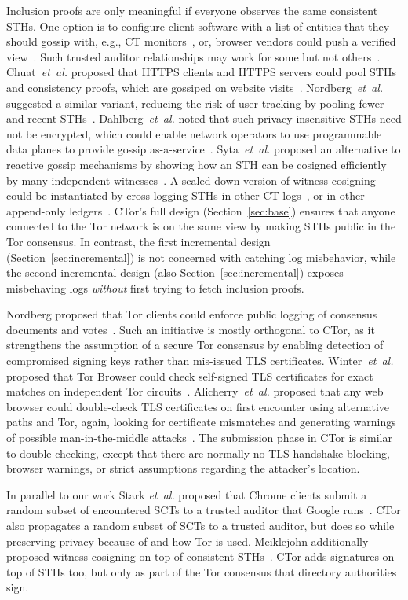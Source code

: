 Inclusion proofs are only meaningful if everyone observes the same consistent
STHs. One option is to configure client software with a list of entities that
they should gossip with, e.g., CT monitors~\cite{chase}, or, browser vendors
could push a verified view~\cite{sth-push}. Such trusted auditor relationships
may work for some but not others~\cite{nordberg}. Chuat~\emph{et~al.} proposed
that HTTPS clients and HTTPS servers could pool STHs and consistency proofs,
which are gossiped on website visits~\cite{chuat}. Nordberg~\emph{et~al.}
suggested a similar variant, reducing the risk of user tracking by pooling fewer
and recent STHs~\cite{nordberg}. Dahlberg~\emph{et~al.} noted that such
privacy-insensitive STHs need not be encrypted, which could enable network
operators to use programmable data planes to provide gossip
as-a-service~\cite{dahlberg}. Syta~\emph{et~al.} proposed an alternative to
reactive gossip mechanisms by showing how an STH can be cosigned efficiently by
many independent witnesses~\cite{syta}. A scaled-down version of witness
cosigning could be instantiated by cross-logging STHs in other CT
logs~\cite{minimal-gossip}, or in other append-only ledgers~\cite{catena}.
CTor's full design (Section~\ref{sec:base}) ensures that anyone connected to the
Tor network is on the same view by making STHs public in the Tor consensus.  In
contrast, the first incremental design (Section~\ref{sec:incremental}) is not
concerned with catching log misbehavior, while the second incremental design
(also Section~\ref{sec:incremental}) exposes misbehaving logs \emph{without}
first trying to fetch inclusion proofs.

Nordberg proposed that Tor clients could enforce public logging of consensus
documents and votes~\cite{consensus-transparency}.  Such an initiative is mostly
orthogonal to CTor, as it strengthens the assumption of a secure Tor consensus
by enabling detection of compromised signing keys rather than mis-issued TLS
certificates.  Winter~\emph{et~al.} proposed that Tor Browser could check
self-signed TLS certificates for exact matches on independent Tor
circuits~\cite{spoiled-onions}.  Alicherry~\emph{et~al.} proposed that any web
browser could double-check TLS certificates on first encounter using alternative
paths and Tor, again, looking for certificate mismatches and generating warnings
of possible man-in-the-middle attacks~\cite{doublecheck}.  The submission phase
in CTor is similar to double-checking, except that there are normally no TLS
handshake blocking, browser warnings, or strict assumptions regarding the
attacker's location.

In parallel to our work Stark \emph{et~al.} proposed that Chrome clients
submit a random subset of encountered SCTs to a trusted auditor that Google
runs~\cite{stark}.  CTor also propagates a random subset of SCTs to a trusted
auditor, but does so while preserving privacy because of and how Tor is used.
Meiklejohn additionally proposed witness cosigning on-top of consistent
STHs~\cite{meiklejohn}.  CTor adds signatures on-top of STHs too, but only as
part of the Tor consensus that directory authorities sign.
